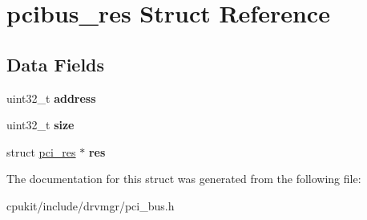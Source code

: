 \hypertarget{structpcibus__res}{}\section{pcibus\+\_\+res Struct Reference}
\label{structpcibus__res}
\subsection*{Data Fields}
\begin{DoxyCompactItemize}
\item 
\mbox{\label{structpcibus__res_a9b098df61fd569e86860b27c1b74a33b}} 
uint32\+\_\+t {\bfseries address}
\item 
\mbox{\label{structpcibus__res_acb36c165db7d1c33bfe38553e0c875ba}} 
uint32\+\_\+t {\bfseries size}
\item 
\mbox{\label{structpcibus__res_ab702a44eb24ca01d913d1fb9aa2c0766}} 
struct \mbox{\hyperlink{structpci__res}{pci\+\_\+res}} $\ast$ {\bfseries res}
\end{DoxyCompactItemize}


The documentation for this struct was generated from the following file\+:\begin{DoxyCompactItemize}
\item 
cpukit/include/drvmgr/pci\+\_\+bus.\+h\end{DoxyCompactItemize}
